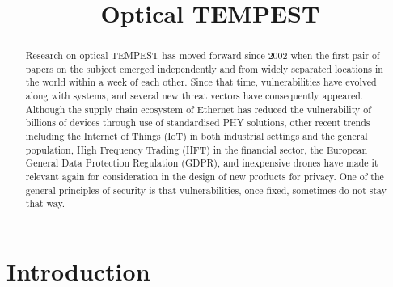 \documentclass[conference]{IEEEtran}
\begin{document}
\title{Optical TEMPEST}

\author{
}


\maketitle

\begin{abstract}
  Research on optical TEMPEST has moved forward since 2002 when the first
  pair of papers on the subject emerged independently and from widely
  separated locations in the world within a week of each other. Since that
  time, vulnerabilities have evolved along with systems, and several new
  threat vectors have consequently appeared. Although the supply chain
  ecosystem of Ethernet has reduced the vulnerability of billions of devices
  through use of standardised PHY solutions, other recent trends including
  the Internet of Things (IoT) in both industrial settings and the general
  population, High Frequency Trading (HFT) in the financial sector, the
  European General Data Protection Regulation (GDPR), and inexpensive drones
  have made it relevant again for consideration in the design of new products
  for privacy. One of the general principles of security is that
  vulnerabilities, once fixed, sometimes do not stay that way.
\end{abstract}

\section{Introduction}
\end{document}
